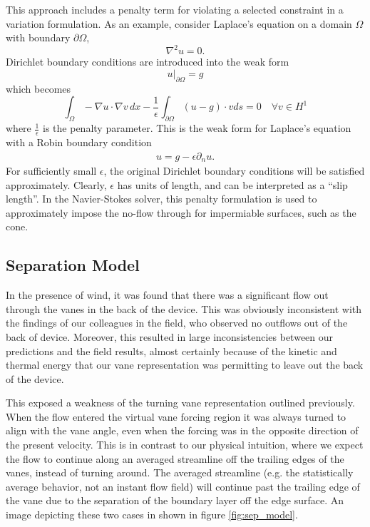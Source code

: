 This approach includes a penalty term for violating a selected
constraint in a variation formulation. As an example, consider Laplace's  
equation on a domain $\Omega$ with boundary $\partial\Omega$, 
\begin{equation}
 \nabla^2 u = 0. 
\end{equation}
Dirichlet boundary conditions are introduced into the weak form
\begin{equation}
 u|_{\partial \Omega} = g
\end{equation}
which becomes 
\begin{equation}
\int_{\Omega}  - \nabla u \cdot \nabla v \, dx - \frac{1}{\epsilon}
 \int_{\partial \Omega} (u-g) \cdot v ds = 0 \quad \forall v \in H^1
\end{equation}
where $\frac{1}{\epsilon}$ is the penalty parameter. This is the weak
form for Laplace's equation with a Robin boundary condition 
\begin{align}
 u = g - \epsilon \partial_n u. 
\end{align}
For sufficiently small $\epsilon$, the original Dirichlet boundary
conditions will be satisfied approximately. Clearly, $\epsilon$ has
units of length, and can be interpreted as a ``slip length''. In the
Navier-Stokes solver, this penalty formulation is used to approximately
impose the no-flow through for impermiable surfaces, such as the
cone.





\subsection{Separation Model}

In the presence of wind, it was found that there was a significant flow
out through the vanes in the back of the device. This was obviously
inconsistent with the findings of our colleagues in the field, who
observed no outflows out of the back of device. Moreover, this resulted
in large inconsistencies between our predictions and the field results,
almost certainly because of the kinetic and thermal energy that our vane
representation was permitting to leave out the back of the device.  

This exposed a weakness of the turning vane representation outlined
previously. When the flow entered the virtual vane forcing region it was
always turned to align with the vane angle, even when the forcing was in
the opposite direction of the present velocity.
This is in contrast to our physical intuition, where we
expect the flow to continue along an averaged streamline
off the trailing edges of the vanes, instead of turning around. 
The averaged streamline (e.g. the statistically average behavior, not
an instant flow field) will continue past the trailing edge of the vane
due to the separation of the boundary layer off the edge surface. An
image depicting these two cases in shown in figure \ref{fig:sep_model}.  

